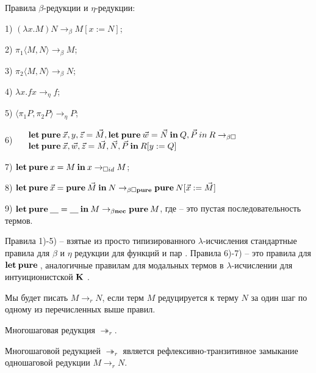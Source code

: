 \begin{defin} Правила $\beta$-редукции и $\eta$-редукции:

1) $(\lambda x. M) N \rightarrow_{\beta} M [x := N]$;

2) $\pi_1 \langle M, N \rangle \rightarrow_{\beta} M$;

3) $\pi_2 \langle M, N \rangle \rightarrow_{\beta} N$;

4) $\lambda x. f x \rightarrow_{\eta} f$;

5) $\langle \pi_1 P, \pi_2 P \rangle \rightarrow_{\eta} P$;

6) $\begin{array}{lll}
& {\bf let \: pure \:} \vec{x}, y, \vec{z} = \vec{M}, {\bf let \: pure \: } \vec{w} = \vec{N} {\: \bf in \: } Q, \vec{P} {\: in \:} R \rightarrow_{\beta \Box} & \\
& {\bf let \: pure \:} \vec{x}, \vec{w}, \vec{z} = \vec{M}, \vec{N}, \vec{P} {\: \bf in \: } R [y := Q]
\end{array}$

7) ${\bf let \: pure \:} x = M {\: \bf in \: } x \rightarrow_{\Box id} M$;

8) ${\bf let \: pure \:} \vec{x} = {\bf pure \:} \vec{M} {\: \bf in \:} N \rightarrow_{\beta \Box {\bf pure}} {\bf pure \:} N [\vec{x} := \vec{M}]$

9) ${\bf let \: pure \:} \underline{\quad} = \underline{\quad} {\: \bf in \:} M \rightarrow_{\beta {\bf nec}} {\bf pure \:} M$, где \underline{\quad} -- это пустая последовательность термов.


\end{defin}

Правила 1)-5) -- взятые из просто типизированного $\lambda$-исчисления стандартные правила для $\beta$ и $\eta$ редукции для функций и пар \cite{Morten}.
Правила 6)-7) -- это правила для ${\bf let \: pure \:}$,
аналогичные правилам для модальных термов в $\lambda$-исчислении для интуиционистской $\bf K$ \cite{ModalK}.

Мы будет писать $M \rightarrow_{r} N$, если терм $M$ редуцируется к терму $N$ за один шаг по одному из перечисленных выше правил.

\begin{defin} Многошаговая редукция $\twoheadrightarrow_{r}$.

  Многошаговой редукцией $\twoheadrightarrow_{r}$ является рефлексивно-транзитивное замыкание одношаговой редукции $M \rightarrow_{r} N$.
\end{defin}

